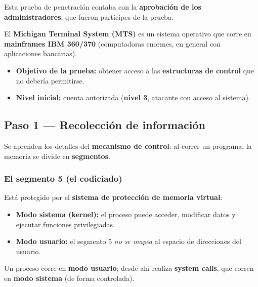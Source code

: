 \documentclass[11pt,a4paper]{article}
\begin{document}
\begin{slidebox}
\centering Esta prueba de penetración contaba con la \textbf{aprobación de los
administradores}, que fueron partícipes de la prueba.
\end{slidebox}

\medskip
El \textbf{Michigan Terminal System (MTS)} es un sistema operativo que corre en
\textbf{mainframes IBM 360/370} (computadoras enormes, en general con aplicaciones bancarias).
\begin{itemize}[leftmargin=1.6em,itemsep=2pt]
  \item \textbf{Objetivo de la prueba:} obtener acceso a las \textbf{estructuras de control}
        que no debería permitirse.
  \item \textbf{Nivel inicial:} cuenta autorizada (\textbf{nivel 3}, atacante con acceso al
        sistema).
\end{itemize}

\subsection{Paso 1 — Recolección de información}

Se aprenden los detalles del \textbf{mecanismo de control}: al correr un programa, la memoria
se divide en \textbf{segmentos}.

\begin{center}
\end{center}

\subsubsection*{El segmento 5 (el codiciado)}
Está protegido por el \textbf{sistema de protección de memoria virtual}:
\begin{itemize}[leftmargin=1.6em,itemsep=2pt]
  \item \textbf{Modo sistema (kernel):} el proceso puede acceder, modificar datos y ejecutar
        funciones privilegiadas.
  \item \textbf{Modo usuario:} el segmento 5 \emph{no se mapea} al espacio de direcciones del
        usuario.
\end{itemize}
Un proceso corre en \textbf{modo usuario}; desde ahí realiza \textbf{system calls}, que
corren en \textbf{modo sistema} (de forma controlada).
\end{document}
